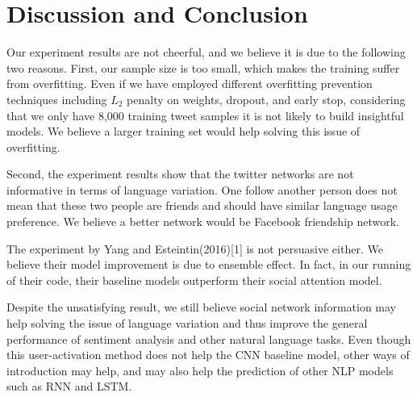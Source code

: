 
\section{Discussion and Conclusion}
Our experiment results are not cheerful, and we believe it is due to the following two reasons.
First, our sample size is too small, which makes the training suffer from overfitting. 
Even if we have employed different overfitting prevention techniques including $L_2$ 
penalty on weights, dropout, and early stop, considering that we only have 8,000 training tweet samples
it is not likely to build insightful models. We believe a larger training set would help solving this 
issue of overfitting.

Second, the experiment results show that the twitter networks are not informative in terms of language
variation. One follow another person does not mean that these two people are friends and should
have similar language usage preference. We believe a better network would be Facebook friendship network.

The experiment by Yang and Esteintin(2016)[1] is not persuasive either. We believe their model improvement is due to ensemble effect. In fact, in our running of their code, their baseline models outperform their social attention model.

Despite the unsatisfying result, we still believe social network information may help solving the issue of 
language variation and thus improve the general performance of sentiment analysis and other natural language tasks. 
Even though this user-activation method does not help the CNN baseline model, other ways of introduction may help, 
and may also help the prediction of other NLP models such as RNN and LSTM.